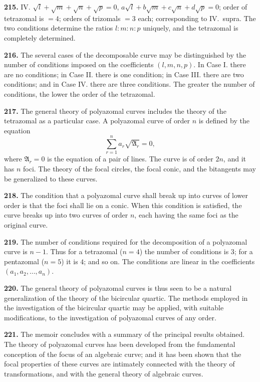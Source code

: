 \documentclass[12pt,a4paper]{article}
\theoremstyle{definition}
\begin{document}
\noindent\textbf{215.} IV. $\sqrt{l} + \sqrt{m} + \sqrt{n} + \sqrt{p} = 0$, $a\sqrt{l} + b\sqrt{m} + c\sqrt{n} + d\sqrt{p} = 0$;
order of tetrazomal is $= 4$; orders of trizomals $= 3$ each; corresponding to IV.\ supra.
The two conditions determine the ratios $l : m : n : p$ uniquely, and the tetrazomal is
completely determined.

\noindent\textbf{216.} The several cases of the decomposable curve may be distinguished by
the number of conditions imposed on the coefficients $(l, m, n, p)$. In Case I. there are
no conditions; in Case II. there is one condition; in Case III. there are two conditions;
and in Case IV. there are three conditions. The greater the number of conditions,
the lower the order of the tetrazomal.

\newpage
\noindent\textbf{217.} The general theory of polyazomal curves includes the theory of the
tetrazomal as a particular case. A polyazomal curve of order $n$ is defined by the
equation
\[
\sum_{r=1}^{n} a_r\sqrt{\mathfrak{A}_r} = 0,
\]
where $\mathfrak{A}_r = 0$ is the equation of a pair of lines. The curve is of order $2n$, and it has
$n$ foci. The theory of the focal circles, the focal conic, and the bitangents may be
generalized to these curves.

\noindent\textbf{218.} The condition that a polyazomal curve shall break up into curves of
lower order is that the foci shall lie on a conic. When this condition is satisfied,
the curve breaks up into two curves of order $n$, each having the same foci as the
original curve.

\noindent\textbf{219.} The number of conditions required for the decomposition of a polyazomal
curve is $n - 1$. Thus for a tetrazomal ($n = 4$) the number of conditions is $3$; for a
pentazomal ($n = 5$) it is $4$; and so on. The conditions are linear in the coefficients
$(a_1, a_2, \ldots, a_n)$.

\noindent\textbf{220.} The general theory of polyazomal curves is thus seen to be a natural
generalization of the theory of the bicircular quartic. The methods employed in the
investigation of the bicircular quartic may be applied, with suitable modifications, to
the investigation of polyazomal curves of any order.

\newpage
\noindent\textbf{221.} The memoir concludes with a summary of the principal results obtained.
The theory of polyazomal curves has been developed from the fundamental conception
of the focus of an algebraic curve; and it has been shown that the focal properties of
these curves are intimately connected with the theory of transformations, and with the
general theory of algebraic curves.
\end{document}
